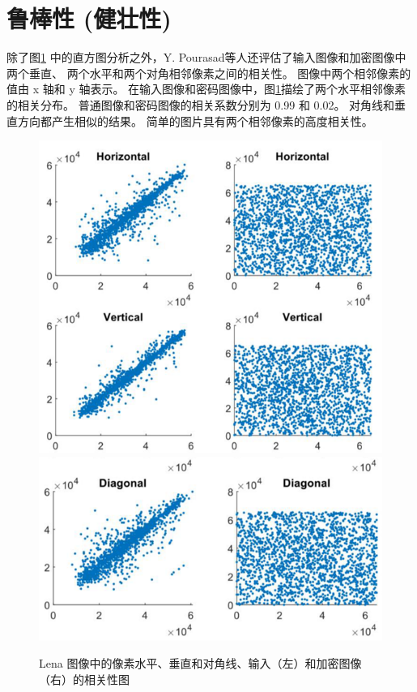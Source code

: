 \section{鲁棒性 (健壮性)}

除了图\ref{fig:4.4} 中的直方图分析之外，Y. Pourasad等人还评估了输入图像和加密图像中两个垂直、
两个水平和两个对角相邻像素之间的相关性。 
图像中两个相邻像素的值由 x 轴和 y 轴表示。 
在输入图像和密码图像中，图\ref{fig:4.4}描绘了两个水平相邻像素的相关分布。 
普通图像和密码图像的相关系数分别为 0.99 和 0.02。 
对角线和垂直方向都产生相似的结果。 简单的图片具有两个相邻像素的高度相关性。

\begin{figure}[ht]
    \begin{center}
        \includegraphics[width=\textwidth]{figure/p7.png}\\
        \includegraphics[width=\textwidth]{figure/p8.png}\\
    \end{center}
    \caption{Lena 图像中的像素水平、垂直和对角线、输入（左）和加密图像（右）的相关性图 \label{fig:4.4}}
\end{figure}

